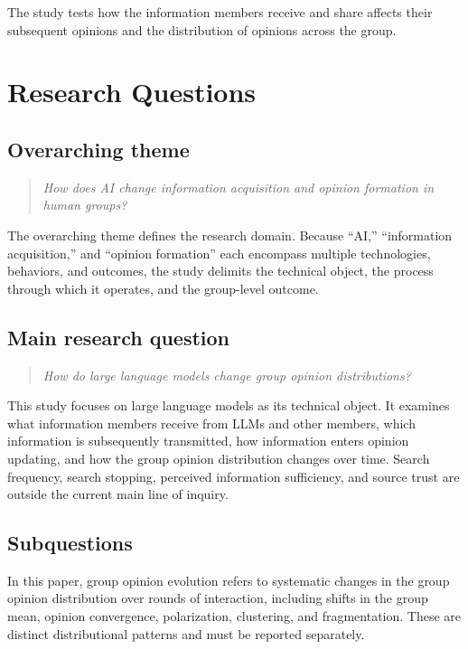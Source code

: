 \documentclass[11pt,a4paper]{article}
\begin{document}
The study tests how the information members receive and share affects their subsequent opinions and the distribution of opinions across the group.

\section{Research Questions}

\subsection{Overarching theme}

\begin{quote}\itshape
How does AI change information acquisition and opinion formation in human groups?
\end{quote}

The overarching theme defines the research domain. Because ``AI,'' ``information acquisition,'' and ``opinion formation'' each encompass multiple technologies, behaviors, and outcomes, the study delimits the technical object, the process through which it operates, and the group-level outcome.

\subsection{Main research question}

\begin{quote}\itshape
How do large language models change group opinion distributions?
\end{quote}

This study focuses on large language models as its technical object. It examines what information members receive from LLMs and other members, which information is subsequently transmitted, how information enters opinion updating, and how the group opinion distribution changes over time. Search frequency, search stopping, perceived information sufficiency, and source trust are outside the current main line of inquiry.

\subsection{Subquestions}

In this paper, group opinion evolution refers to systematic changes in the group opinion distribution over rounds of interaction, including shifts in the group mean, opinion convergence, polarization, clustering, and fragmentation. These are distinct distributional patterns and must be reported separately.
\end{document}
